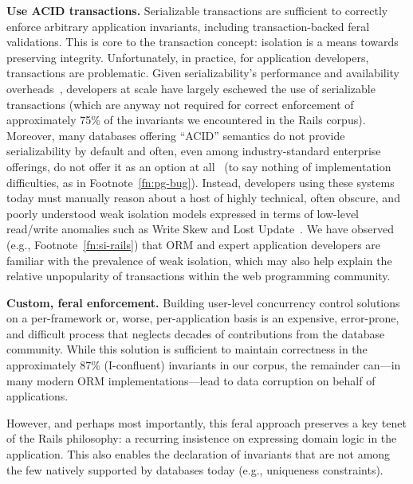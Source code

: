 \begin{impenumerate}
\item \textbf{Use ACID transactions.} Serializable transactions are
  sufficient to correctly enforce arbitrary application invariants,
  including transaction-backed feral validations. This is core to the
  transaction concept: isolation is a means towards preserving
  integrity.\vspace{.5em}
  Unfortunately, in practice, for application developers, transactions
  are problematic. Given serializability's performance and
  availability overheads~\cite{brewer-cap}, developers at scale have
  largely eschewed the use of serializable transactions (which are
  anyway not required for correct enforcement of approximately 75\% of
  the invariants we encountered in the Rails corpus). Moreover, many
  databases offering ``ACID'' semantics do not provide serializability
  by default and often, even among industry-standard enterprise
  offerings, do not offer it as an option at all~\cite{hat-vldb} (to
  say nothing of implementation difficulties, as in
  Footnote~\ref{fn:pg-bug}). Instead, developers using these systems
  today must manually reason about a host of highly technical, often
  obscure, and poorly understood weak isolation models expressed in
  terms of low-level read/write anomalies such as Write Skew and Lost
  Update~\cite{adya-isolation,consistency-borders}. We have observed
  (e.g., Footnote~\ref{fn:si-rails}) that ORM and expert application
  developers are familiar with the prevalence of weak isolation, which
  may also help explain the relative unpopularity of transactions
  within the web programming community.

\item\textbf{Custom, feral enforcement.} Building user-level
  concurrency control solutions on a per-framework or, worse,
  per-application basis is an expensive, error-prone, and difficult
  process that neglects decades of contributions from the database 
  community. While this solution is sufficient to maintain correctness
  in the approximately 87\% (I-confluent) invariants in our corpus, the remainder
  can---in many modern ORM implementations---lead to data corruption on
  behalf of applications. \vspace{.5em}

  However, and perhaps most importantly, this feral approach preserves
  a key tenet of the Rails philosophy: a recurring insistence on
  expressing domain logic in the application. This also enables the
  declaration of invariants that are not among the few natively
  supported by databases today (e.g., uniqueness constraints).
\end{impenumerate}

